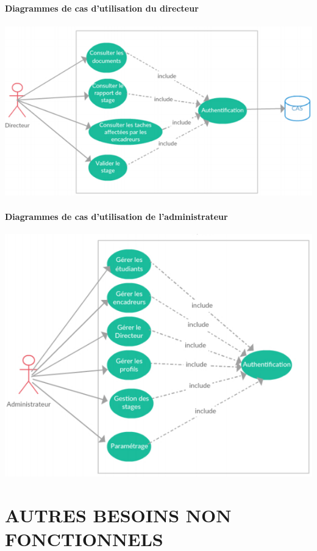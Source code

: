 \documentclass{scrreprt}
\begin{document}
\subsubsection{Diagrammes de cas d'utilisation du directeur}
\begin{center}
	\includegraphics[scale=0.55]{image/casutilisationdudirecteur.png}
\end{center}
\subsubsection{Diagrammes de cas d'utilisation de l'administrateur}
\begin{center}
	\includegraphics[scale=0.55]{image/casutilisationdeadministrateur.png}
\end{center}


\chapter{AUTRES BESOINS NON FONCTIONNELS}
\end{document}
